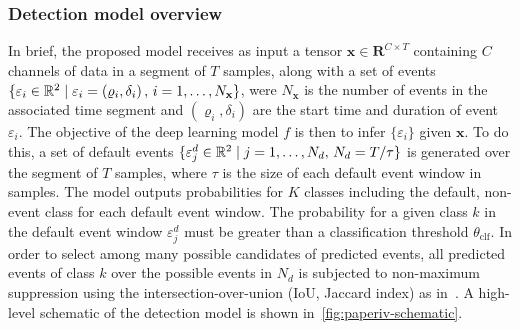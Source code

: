 \subsubsection{Detection model overview}
In brief, the proposed model receives as input a tensor $\mathbf{x}\in \mathbf{R}^{C \times T}$ containing $C$ channels of data in a segment of $T$ samples, along with a set of events $\lbrace \varepsilon_{i} \in \mathbb{R}^{2} \mid \varepsilon_i = \left( \varrho_{i}, \delta_{i} \right),\, i=1,\ldots,N_{\mathbf{x}} \rbrace$, were $N_{\mathbf{x}}$ is the number of events in the associated time segment and $\left(\varrho_{i},\delta_{i}\right)$ are the start time and duration of event $\varepsilon_i$.
The objective of the deep learning model $f$ is then to infer $\lbrace \varepsilon_{i} \rbrace$ given $\mathbf{x}$.
To do this, a set of default events $\lbrace \varepsilon_{j}^{d} \in \mathbb{R}^2 \mid j=1,\ldots,N_{d},\, N_{d} = T/\tau \rbrace$ is generated over the segment of $T$ samples, where $\tau$ is the size of each default event window in samples.
The model outputs probabilities for $K$ classes including the default, non-event class for each default event window.
The probability for a given class $k$ in the default event window $\varepsilon_j^d$ must be greater than a classification threshold $\theta_{\mathrm{clf}}$.
In order to select among many possible candidates of predicted events, all predicted events of class $k$ over the possible events in $N_d$ is subjected to non-maximum suppression using the intersection-over-union (IoU, Jaccard index) as in~\cite{Redmon2016}.
A high-level schematic of the detection model is shown in~\cref{fig:paperiv-schematic}.

